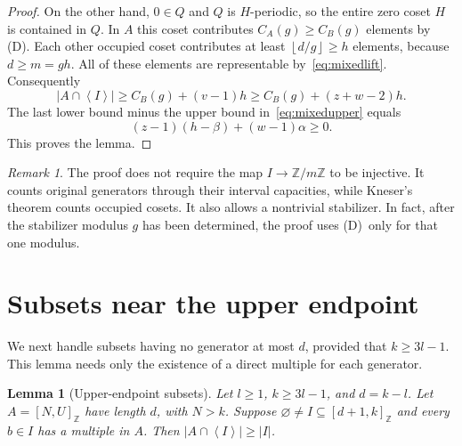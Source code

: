 \documentclass[11pt,a4paper]{article}
\numberwithin{equation}{section}
\newtheorem{lemma}[theorem]{Lemma}
\theoremstyle{remark}
\newtheorem{remark}[theorem]{Remark}
\newcommand{\Z}{\mathbb Z}
\newcommand{\sg}[1]{\left\langle #1\right\rangle}
\newcommand{\floor}[1]{\left\lfloor #1\right\rfloor}
\newcommand{\Dcond}{\textup{(D)}}
\newcommand{\interval}[2]{[#1,#2]_{\Z}}
\begin{document}
\begin{proof}
On the other hand, $0\in Q$ and $Q$ is $H$-periodic, so the entire
zero coset $H$ is contained in $Q$. In $A$ this coset contributes
$C_A(g)\ge C_B(g)$ elements by \Dcond.
Each other occupied coset contributes at least
$\floor{d/g}\ge h$ elements, because $d\ge m=gh$.
All of these elements are representable by~\eqref{eq:mixedlift}.
Consequently
\begin{equation}\label{eq:mixedlower}
  |A\cap\sg{I}|
  \ge C_B(g)+(v-1)h
  \ge C_B(g)+(z+w-2)h.
\end{equation}
The last lower bound minus the upper bound in~\eqref{eq:mixedupper}
equals
\begin{equation}\label{eq:mixeddifference}
  (z-1)(h-\beta)+(w-1)\alpha\ge0.
\end{equation}
This proves the lemma.
\end{proof}

\begin{remark}\label{rem:mixedlocal}
The proof does not require the map $I\longrightarrow\Z/m\Z$ to be
injective. It counts original generators through their interval capacities,
while Kneser's theorem counts occupied cosets. It also allows a nontrivial
stabilizer. In fact, after the stabilizer modulus $g$ has been determined,
the proof uses \Dcond\ only for that one modulus.
\end{remark}

\section{Subsets near the upper endpoint}\label{sec:tail}

We next handle subsets having no generator at most $d$, provided that
$k\ge3l-1$. This lemma needs only the existence of a direct multiple
for each generator.

\begin{lemma}[Upper-endpoint subsets]\label{lem:tail}
Let $l\ge1$, $k\ge3l-1$, and $d=k-l$.
Let $A=\interval{N}{U}$ have length $d$, with $N>k$.
Suppose $\varnothing\ne I\subseteq\interval{d+1}{k}$ and every $b\in I$
has a multiple in $A$. Then $|A\cap\sg{I}|\ge|I|$.
\end{lemma}
\end{document}
